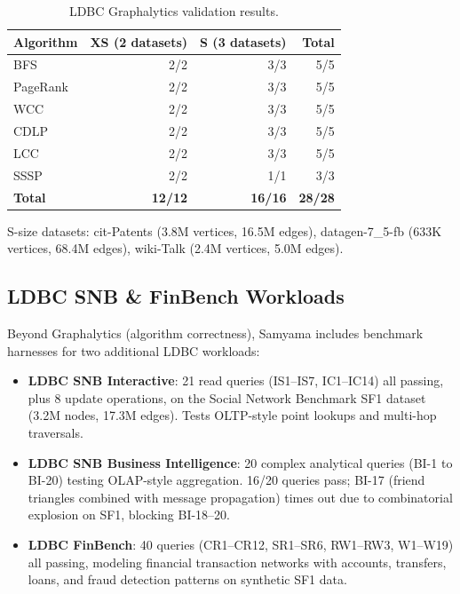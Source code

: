 \documentclass[11pt]{article}
\begin{document}
\begin{table}[H]
  \centering
  \caption{LDBC Graphalytics validation results.}
  \label{tab:ldbc}
  \begin{tabular}{@{}lrrr@{}}
    \toprule
    \textbf{Algorithm} & \textbf{XS (2 datasets)} & \textbf{S (3 datasets)} & \textbf{Total} \\
    \midrule
    BFS      & 2/2 & 3/3 & 5/5 \\
    PageRank & 2/2 & 3/3 & 5/5 \\
    WCC      & 2/2 & 3/3 & 5/5 \\
    CDLP     & 2/2 & 3/3 & 5/5 \\
    LCC      & 2/2 & 3/3 & 5/5 \\
    SSSP     & 2/2 & 1/1 & 3/3 \\
    \midrule
    \textbf{Total} & \textbf{12/12} & \textbf{16/16} & \textbf{28/28} \\
    \bottomrule
  \end{tabular}
\end{table}

S-size datasets: cit-Patents (3.8M vertices, 16.5M edges), datagen-7\_5-fb (633K vertices, 68.4M edges), wiki-Talk (2.4M vertices, 5.0M edges).

\subsection{LDBC SNB \& FinBench Workloads}

Beyond Graphalytics (algorithm correctness), Samyama includes benchmark harnesses for two additional LDBC workloads:

\begin{itemize}[leftmargin=*]
  \item \textbf{LDBC SNB Interactive}: 21 read queries (IS1--IS7, IC1--IC14) all passing, plus 8 update operations, on the Social Network Benchmark SF1 dataset (3.2M nodes, 17.3M edges). Tests OLTP-style point lookups and multi-hop traversals.
  \item \textbf{LDBC SNB Business Intelligence}: 20 complex analytical queries (BI-1 to BI-20) testing OLAP-style aggregation. 16/20 queries pass; BI-17 (friend triangles combined with message propagation) times out due to combinatorial explosion on SF1, blocking BI-18--20.
  \item \textbf{LDBC FinBench}: 40 queries (CR1--CR12, SR1--SR6, RW1--RW3, W1--W19) all passing, modeling financial transaction networks with accounts, transfers, loans, and fraud detection patterns on synthetic SF1 data.
\end{itemize}
\end{document}
